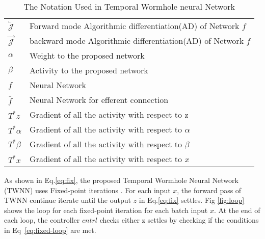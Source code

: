 \documentclass{article}
\begin{document}
\begin{table}[htb]
	\centering
	\caption{The Notation Used in Temporal Wormhole neural Network}
	\label{tab:notation}

	\begin{tabular}{ll}
		\toprule
		$\overleftarrow{\mathcal{J}}$& Forward mode Algorithmic differentiation(AD) of Network $f$ \\
		$\overrightarrow{\mathcal{J}}$& backward mode Algorithmic differentiation(AD) of Network $f$  \\
		$\alpha$& Weight to the proposed network  \\
		$\beta$& Activity to the proposed network  \\
		$f$& Neural  Network  \\
		$\bar{f}$& Neural  Network for efferent connection\\
		$T^{*}z$& Gradient  of all the activity with respect to z  \\
		$T^{*}\alpha$& Gradient  of all the activity with respect to $\alpha$ \\
		$T^{*}\beta$& Gradient of all the activity with respect to $\beta$  \\
		$T^{*}x$& Gradient of all the activity with respect to $x$  \\
	\end{tabular}

\end{table}

As shown in Eq.\eqref{eq:fix}, the proposed Temporal Wormhole Neural Network (TWNN) uses Fixed-point iterations \cite{pearlmutteralgorithmic}. For each input $x$, the forward pass of TWNN continue iterate until the output $z$ in Eq.\eqref{eq:fix} settles. Fig \ref{fig:loop} shows the loop for each fixed-point iteration for each batch input $x$. At the end of each loop, the controller $cntrl$ checks either z settles by checking if the conditions in Eq~\eqref{eq:fixed-loop} are met.
\end{document}
